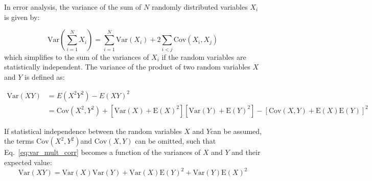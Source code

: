 In error analysis, the variance of the sum of $N$ randomly distributed variables $X_i$ is given by:

\begin{equation}
\label{eq:unc_sum}
\mathrm{Var}\left(\sum_{i=1}^N X_i\right) = \sum_{i=1}^N\mathrm{Var}(X_i) + 2\sum_{i < j}\mathrm{Cov}(X_i, X_j)
\end{equation}
which simplifies to the sum of the variances of $X_i$ if the random variables are statistically independent.
%
The variance of the product of two random variables $X$ and $Y$ is defined as:

\begin{align}
\label{eq:var_mult_corr}
\mathrm{Var}(X Y)&=E\left(X^{2} Y^{2}\right)-E(X Y)^{2} \\
&= \mathrm{Cov}\left(X^{2}, Y^{2}\right)+\left[\mathrm{Var}(X)+\mathrm{E}(X)^{2}\right] \left[\mathrm{Var}(Y)+\mathrm{E}(Y)^{2}\right]-[\mathrm{Cov}\left(X, Y\right)+\mathrm{E}(X)  \mathrm{E}(Y)]^{2} \nonumber
\end{align}

If statistical independence between the random variables $X$ and $Y$can be assumed, the terms $\mathrm{Cov}\left(X^{2}, Y^{2}\right)$and $\mathrm{Cov}\left(X, Y\right)$ can be omitted, such that Eq.~\ref{eq:var_mult_corr} becomes a function of the variances of $X$ and $Y$ and their expected value:
\begin{equation}
\label{eq:unc_prod}
\mathrm{Var}(XY) = \mathrm{Var}(X)\mathrm{Var}(Y) + \mathrm{Var}(X) \mathrm{E}(Y)^2 + \mathrm{Var}(Y) \mathrm{E}(X)^2
\end{equation}
